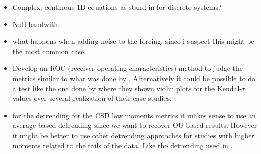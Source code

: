 \begin{itemize}
	
	\item Complex, continous 1D equations as stand in for discrete systems?
	
	\item Null bandwith\cite{Kaur2022}.
	\item what happens when adding noise to the forcing. since i suspect this might be the most common case.
	\item Develop an ROC (receiver-operating characteristics) method to judge the metrics similar to what was done by \cite{Bury2020,Romano2018}. Alternatively it could be possible to do a test like the one done by \cite{Kaur2022} where they shown violin plots for the Kendal-$\tau$ values over several realization of their case studies.
		
		\item 
		for the detrending for the CSD low moments metrics it makes sense to use an average based detrending since we want to recover OU based results. However it might be better to use other detrending approaches for studies with higher moments related to the tails of the data. Like the detrending used in \cite{}.
\end{itemize}